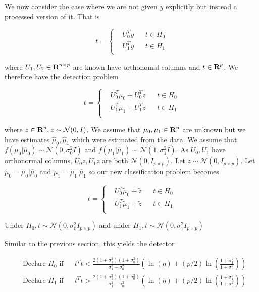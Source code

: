 \documentclass[english]{article}
\begin{document}
We now consider the case where we are not given $y$ explicitly but instead a processed version of it. That is

\begin{equation}
t=\left\{
\begin{aligned}
&U_0^Ty
&& t\in H_0\\
&U_1^Ty
&& t\in H_1\\
\end{aligned}\right.
\end{equation}

where $U_1, U_2\in{\mbox{\bf R}}^{n\times p}$ are known have orthonomal columns and $t\in{\mbox{\bf R}}^p$. We therefore have the detection problem

\begin{equation}
t=\left\{
\begin{aligned}
&U_0^T\mu_0 + U_0^Tz
&& t\in H_0\\
&U_1^T\mu_1 + U_1^Tz
&& t\in H_1\\
\end{aligned}\right.
\end{equation}

where $z\in{\mbox{\bf R}}^n, z\sim\mathcal{N}(0,I)$. We assume that $\mu_0,\mu_1\in{\mbox{\bf R}}^n$ are unknown but we have estimates $\hat{\mu}_0, \hat{\mu}_1$ which were estimated from the data. We assume that $f(\mu_0|\hat{\mu}_0)\sim\mathcal{N}(0,\sigma_0^2I)$ and $f(\mu_1|\hat{\mu}_1)\sim\mathcal{N}(1,\sigma_1^2I)$. As $U_0,U_1$ have orthonormal columns, $U_0z, U_1z$ are both $\mathcal{N}(0,I_{p\times p})$. Let $\tilde{z}\sim\mathcal{N}(0,I_{p\times p})$. Let $\tilde{\mu}_0=\mu_0|\hat{\mu}_0$ and $\tilde{\mu}_1=\mu_1|\hat{\mu}_1$ so our new classification problem becomes

\begin{equation}
t=\left\{
\begin{aligned}
&U_0^T\tilde{\mu}_0 + \tilde{z}
&& t\in H_0\\
&U_1^T\tilde{\mu}_1 + \tilde{z}
&& t\in H_1\\
\end{aligned}\right.
\end{equation}

Under $H_0, t\sim\mathcal{N}(0,\sigma_0^2I_{p\times p})$ and under $H_1, t\sim\mathcal{N}(0,\sigma_1^2I_{p\times p})$

Similar to the previous section, this yields the detector

\begin{equation}
\begin{aligned}
&\text{Declare } H_0 \text{ if}
&& t^Tt < \frac{2(1+\sigma_1^2)(1+\sigma_0^2)}{\sigma_1^2-\sigma_0^2}\left(\ln(\eta) +(p/2)\ln\left(\frac{1+\sigma_1^2}{1+\sigma_0^2}\right)\right)\\
& \text{Declare } H_1 \text{ if}
&& t^Tt > \frac{2(1+\sigma_1^2)(1+\sigma_0^2)}{\sigma_1^2-\sigma_0^2}\left(\ln(\eta) +(p/2)\ln\left(\frac{1+\sigma_1^2}{1+\sigma_0^2}\right)\right)\\
\end{aligned}
\end{equation}
\end{document}
